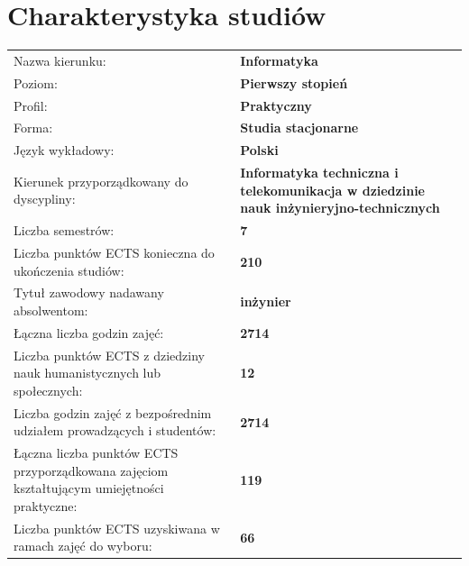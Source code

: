 \documentclass[12pt,a4paper]{article}
\renewcommand{\arraystretch}{1.35}
\begin{document}
\vspace{1cm}
\thispagestyle{empty}
\newpage
\setcounter{page}{1}

\tableofcontents
\newpage

\section{Charakterystyka studiów}

{\renewcommand{\arraystretch}{1.4}
\begin{tabularx}{\textwidth}{@{}Xp{8.5cm}@{}}
\toprule
  {\small Nazwa kierunku:} & {\small\textbf{Informatyka}} \\
  {\small Poziom:} & {\small\textbf{Pierwszy stopień}} \\
  {\small Profil:} & {\small\textbf{Praktyczny}} \\
  {\small Forma:} & {\small\textbf{Studia stacjonarne}} \\
  {\small Język wykładowy:} & {\small\textbf{Polski}} \\
  {\small Kierunek przyporządkowany do dyscypliny:} & {\small\textbf{Informatyka techniczna i telekomunikacja w dziedzinie nauk inżynieryjno-technicznych}} \\
\midrule
  {\small Liczba semestrów:} & {\small\textbf{7}} \\
  {\small Liczba punktów ECTS konieczna do ukończenia studiów:} & {\small\textbf{210}} \\
  {\small Tytuł zawodowy nadawany absolwentom:} & {\small\textbf{inżynier}} \\
\midrule
  {\small Łączna liczba godzin zajęć:} & {\small\textbf{2714}} \\
  {\small Liczba punktów ECTS z dziedziny nauk humanistycznych lub społecznych:} & {\small\textbf{12}} \\
  {\small Liczba godzin zajęć z bezpośrednim udziałem prowadzących i studentów:} & {\small\textbf{2714}} \\
  {\small Łączna liczba punktów ECTS przyporządkowana zajęciom kształtującym umiejętności praktyczne:} & {\small\textbf{119}} \\
  {\small Liczba punktów ECTS uzyskiwana w ramach zajęć do wyboru:} & {\small\textbf{66}} \\
\bottomrule
\end{tabularx}}

\bigskip
\end{document}
